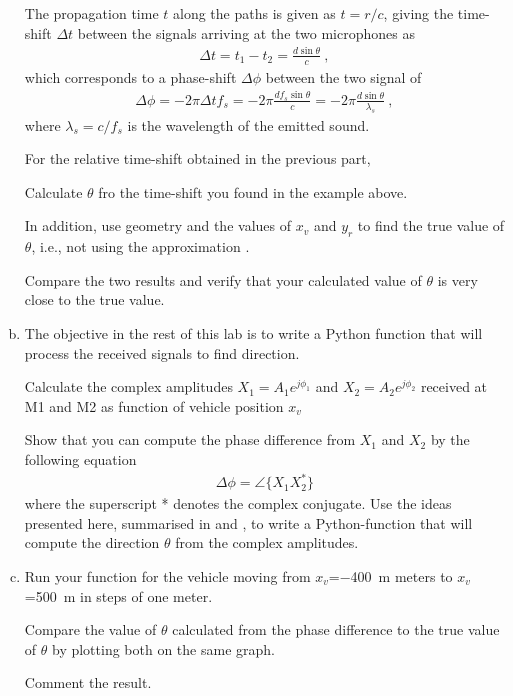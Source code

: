 \begin{enumerate}[a)]
	The propagation time $t$ along the paths is given as $t=r/c$, giving the time-shift $\Delta t$ between the signals arriving at the two microphones as
	\begin{align}
		\Delta t = t_1-t_2 = \frac{d \sin\theta }{c} \:,
	\end{align}
	which corresponds to a phase-shift $\Delta \phi$ between the two signal of
	\begin{align}
		\Delta \phi = -2\pi \Delta t f_s = -2 \pi \frac{d f_s \sin\theta }{c} 
		= -2 \pi \frac{d \sin\theta }{\lambda_s}\:,
		\label{eq:phaseshift-approximated}
	\end{align}
	where $\lambda_s=c/f_s$ is the wavelength of the emitted sound.
	
	For the relative time-shift obtained in the previous part, 
	
	Calculate $\theta$ fro the time-shift you found in the example above.
	
	In addition, use geometry and the values of $x_v$ and $y_r$ to find the true value of $\theta$, i.e., not using the approximation . 
	
	Compare the two results and verify that your calculated value of $\theta$ is very close to the true value.
	
	\item The objective in the rest of this lab is to write a Python function that will process the received signals to find direction. 
	
	Calculate the complex amplitudes $X_1 = A_1 e^{j\phi_1}$ and $X_2 = A_2 e^{j\phi_2}$ received at M1 and M2 as function of vehicle position $x_v$
	
	Show that you can compute the phase difference from $X_1$ and $X_2$ by the following equation
	\begin{align*}
		\Delta \phi = \angle \{ X_1 X_2^* \}
	\end{align*}
	where the superscript * denotes the complex conjugate. Use the ideas presented here, summarised in  and , to write a Python-function that will compute the direction $\theta$ from the complex amplitudes.
		
	\item Run your function for the vehicle moving from $x_v$=\qty{-400}{m} meters to  $x_v$=\qty{+500}{m} in steps of one meter.
	
	Compare the value of $\theta$ calculated from the phase difference to the true value of $\theta$ by plotting both on the same graph.
	
	Comment the result.
		
\end{enumerate}



